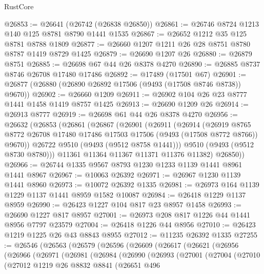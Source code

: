 \begin{lexlean}{RustCore}
\begin{coremodule}
@26853 := @26641 (@26742 (@26838 @26850))
@26861 := @26746 @8724 @1213 @140 @125 @8781 @8790 @1441 @1535
@26867 := @26652 @1212 @35 @125 @8781 @8788 @1809
@26877 := @26660 @1207 @1211 @26 @28 @8751 @8780 @8787 @1419 @8729 @1425
@26879 := @26690 @1207 @26
@26880 := @26879 @8751
@26885 := @26698 @67 @44 @26 @8378 @4270
@26890 := @26885 @8737 @8746 @26708 @17480 @17486
@26892 := @17489 (@17501 @67)
@26901 := @26877 (@26880 (@26890 @26892 @17506 (@9493 (@17508 @8746 @8738)) @9670))
@26902 := @26660 @1209
@26911 := @26902 @104 @26 @23 @8777 @1441 @1458 @1419 @8757 @1425
@26913 := @26690 @1209 @26
@26914 := @26913 @8777
@26919 := @26698 @61 @44 @26 @8378 @4270
@26956 := @26632
    (@26853
      (@26861
        (@26867
          (@26901
            (@26911
              (@26914
                (@26919
                  @8765
                  @8772
                  @26708
                  @17480
                  @17486
                  @17503
                  @17506
                  (@9493 (@17508 @8772 @8766))
                  @9670))
              @26722
              @9510
              (@9493 (@9512 @8758 @1441)))
            @9510
            (@9493 (@9512 @8730 @8780)))
          @11361
          @11364
          @11367
          @11371
          @11376
          @11382)
        @26850))
@26966 := @26744 @1335 @9567 @8793 @1230 @1233 @1139 @1441 @8961 @1441 @8967
@26967 := @10063 @26392
@26971 := @26967 @1230 @1139 @1441 @8960
@26973 := @10072 @26392 @1335
@26981 := @26973 @164 @1139 @1229 @1137 @1441 @8959 @1582 @10087
@26984 := @26418 @1229 @1137 @8959
@26990 := @26423 @1227 @104 @817 @23 @8957 @1458
@26993 := @26690 @1227 @817 @8957
@27001 := @26973 @208 @817 @1226 @44 @1441 @8956 @7797 @23579
@27004 := @26418 @1226 @44 @8956
@27010 := @26423 @1219 @1225 @26 @43 @8843 @8955
@27012 := @11235 @26392 @1335
@27255 := @26546
    (@26563
      (@26579
        (@26596
          (@26609
            (@26617
              (@26621
                (@26956
                  (@26966
                    (@26971
                      (@26981
                        (@26984
                          (@26990
                            (@26993
                              (@27001
                                (@27004
                                  (@27010
                                    (@27012
                                      @1219
                                      @26
                                      @8832
                                      @8841
                                      (@26651
                                        @496

\end{coremodule}
\end{lexlean}
